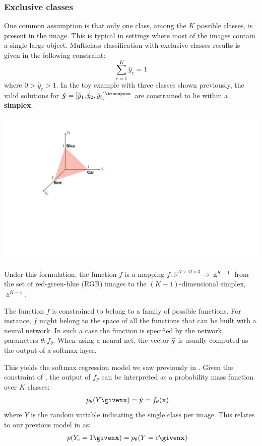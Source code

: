 \subsubsection{Exclusive classes}

One common assumption is that only one class, among the $K$ possible classes, is present in the image. This is typical in settings where most of the images contain a single large object.   
Multiclass classification with exclusive classes results is given in the following constraint: 
\begin{equation}
\sum_{c=1}^K \hat{y}_c=1 \label{eqn:object_recognition:sum_to_one_constraint}
\end{equation}
where $0>\hat{y}_c>1$.
In the toy example with three classes shown previously, the valid solutions for $\hat{\mathbf{y}}=[\hat{y}_1, \hat{y}_2, \hat{y}_3]^\transpose$ are constrained to lie within a \textbf{simplex}.

\centerline{
\includegraphics[width=.3\linewidth]{figures/object_recognition/simplex_v2.pdf}
}

Under this formulation, the function $f$ is a mapping $f:\mathbb{R}^{N \times M \times 3} \rightarrow \vartriangle^{K-1}$ from the set of red-green-blue (RGB) images to the $(K-1)$-dimensional simplex, $\vartriangle^{K-1}$. 


The function $f$ is constrained to belong to a family of possible functions. For instance, $f$ might belong to the space of all the functions that can be built with a neural network. In such a case the function is specified by the network parameters $\theta: f_\theta$. When using a neural net, the vector $\hat{\mathbf{y}}$ is usually computed as the output of a softmax layer. 

This yields the softmax regression model we saw previously in \sect{\ref{sec:intro_to_learning:image_classification}}. Given the constraint of \eqn{\ref{eqn:object_recognition:sum_to_one_constraint}}, the output of $f_{\theta}$ can be interpreted as a probability mass function over $K$ classes:
\begin{align}
    p_{\theta}(Y \given \mathbf{x}) &= \hat{\mathbf{y}} = f_{\theta}(\mathbf{x})
\end{align}
where $Y$ is the random variable indicating the single class per image. This relates to our previous model in \eqn{\ref{eqn:object_recognition:classification_probability_model}} as:
\begin{align}
    p(Y_c=1 \given \mathbf{x}) &= p_{\theta}(Y=c \given \mathbf{x})
\end{align}

